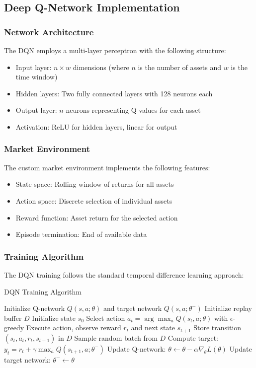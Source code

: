 \documentclass[12pt,a4paper]{article}
\begin{document}
\subsection{Deep Q-Network Implementation}

\subsubsection{Network Architecture}
The DQN employs a multi-layer perceptron with the following structure:
\begin{itemize}
\item Input layer: $n \times w$ dimensions (where $n$ is the number of assets and $w$ is the time window)
\item Hidden layers: Two fully connected layers with 128 neurons each
\item Output layer: $n$ neurons representing Q-values for each asset
\item Activation: ReLU for hidden layers, linear for output
\end{itemize}

\subsubsection{Market Environment}
The custom market environment implements the following features:
\begin{itemize}
\item State space: Rolling window of returns for all assets
\item Action space: Discrete selection of individual assets
\item Reward function: Asset return for the selected action
\item Episode termination: End of available data
\end{itemize}

\subsubsection{Training Algorithm}
The DQN training follows the standard temporal difference learning approach:

\begin{algorithm}
\caption{DQN Training Algorithm}
\begin{algorithmic}[1]
\STATE Initialize Q-network $Q(s,a;\theta)$ and target network $Q(s,a;\theta^-)$
\STATE Initialize replay buffer $D$
    \STATE Initialize state $s_0$
        \STATE Select action $a_t = \arg\max_a Q(s_t, a; \theta)$ with $\epsilon$-greedy
        \STATE Execute action, observe reward $r_t$ and next state $s_{t+1}$
        \STATE Store transition $(s_t, a_t, r_t, s_{t+1})$ in $D$
        \STATE Sample random batch from $D$
        \STATE Compute target: $y_t = r_t + \gamma \max_a Q(s_{t+1}, a; \theta^-)$
        \STATE Update Q-network: $\theta \leftarrow \theta - \alpha \nabla_\theta L(\theta)$
            \STATE Update target network: $\theta^- \leftarrow \theta$
        \ENDIF
    \ENDFOR
\ENDFOR
\end{algorithmic}
\end{algorithm}
\end{document}
